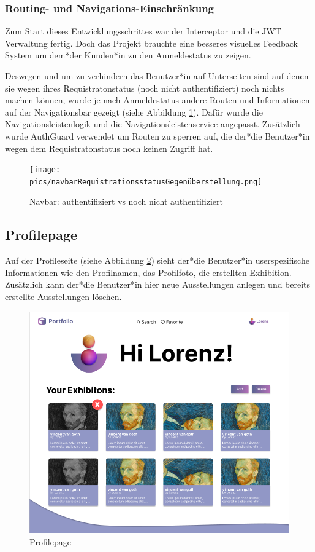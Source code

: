 \subsubsection{Routing- und Navigations-Einschränkung}
Zum Start dieses Entwicklungsschrittes war der Interceptor und die JWT Verwaltung fertig. Doch das Projekt brauchte eine besseres visuelles Feedback System um dem*der Kunden*in zu den Anmeldestatus zu zeigen.

Deswegen und um zu verhindern das Benutzer*in auf Unterseiten sind auf denen sie wegen ihres Requistratonstatus (noch nicht authentifiziert) noch nichts machen können, wurde je nach Anmeldestatus andere Routen und Informationen auf der Navigationsbar gezeigt (siehe Abbildung \ref{fig:impl:navbarvergleich}). Dafür wurde die Navigationsleistenlogik und die Navigationsleistenservice angepasst. Zusätzlich wurde AuthGuard verwendet um Routen zu sperren auf, die der*die Benutzer*in wegen dem Requistratonstatus noch keinen Zugriff hat. 

\begin{figure}
  \centering
  \texttt{[image: pics/navbarRequistrationsstatusGegenüberstellung.png]}
  \caption{Navbar: authentifiziert vs noch nicht authentifiziert}
  \label{fig:impl:navbarvergleich}
\end{figure}

\subsection{Profilepage}
Auf der Profileseite (siehe Abbildung \ref{fig:impl:sign:profile}) sieht der*die Benutzer*in userspezifische Informationen wie den Profilnamen, das Profilfoto, die erstellten Exhibition. Zusätzlich kann der*die Benutzer*in hier neue Ausstellungen anlegen und bereits erstellte Ausstellungen löschen. 

\begin{figure}
  \centering
  \includegraphics[scale=0.5]{pics/profilepage.png}
  \caption{Profilepage}
  \label{fig:impl:sign:profile}
\end{figure}